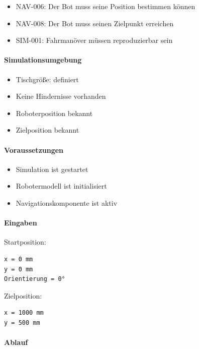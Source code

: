 \begin{itemize}
\tightlist
\item
  NAV-006: Der Bot muss seine Position bestimmen können
\item
  NAV-008: Der Bot muss seinen Zielpunkt erreichen
\item
  SIM-001: Fahrmanöver müssen reproduzierbar sein
\end{itemize}

\paragraph{Simulationsumgebung}\label{simulationsumgebung-1}

\begin{itemize}
\tightlist
\item
  Tischgröße: definiert
\item
  Keine Hindernisse vorhanden
\item
  Roboterposition bekannt
\item
  Zielposition bekannt
\end{itemize}

\paragraph{Voraussetzungen}\label{voraussetzungen-16}

\begin{itemize}
\tightlist
\item
  Simulation ist gestartet
\item
  Robotermodell ist initialisiert
\item
  Navigationskomponente ist aktiv
\end{itemize}

\paragraph{Eingaben}\label{eingaben-15}

Startposition:

\begin{verbatim}
x = 0 mm
y = 0 mm
Orientierung = 0°
\end{verbatim}

Zielposition:

\begin{verbatim}
x = 1000 mm
y = 500 mm
\end{verbatim}

\paragraph{Ablauf}\label{ablauf-16}

